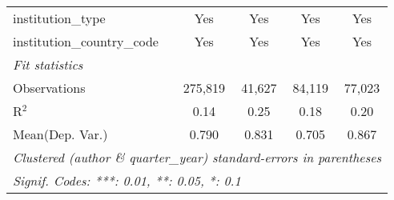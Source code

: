 \begin{tabular}{lcccc}
   institution\_type            & Yes           & Yes           & Yes           & Yes\\  
   institution\_country\_code   & Yes           & Yes           & Yes           & Yes\\  
   \midrule
   \emph{Fit statistics}\\
   Observations                 & 275,819       & 41,627        & 84,119        & 77,023\\  
   R$^2$                        & 0.14          & 0.25          & 0.18          & 0.20\\  
Mean(Dep. Var.) & 0.790 & 0.831 & 0.705 & 0.867 \\
   \midrule \midrule
   \multicolumn{5}{l}{\emph{Clustered (author \& quarter\_year) standard-errors in parentheses}}\\
   \multicolumn{5}{l}{\emph{Signif. Codes: ***: 0.01, **: 0.05, *: 0.1}}\\
\end{tabular}
\par\endgroup
